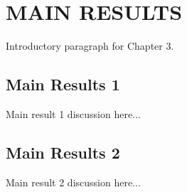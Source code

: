 \chapter{MAIN RESULTS}

Introductory paragraph for Chapter 3.

\section{Main Results 1}

Main result 1 discussion here...

\section{Main Results 2}

Main result 2 discussion here...